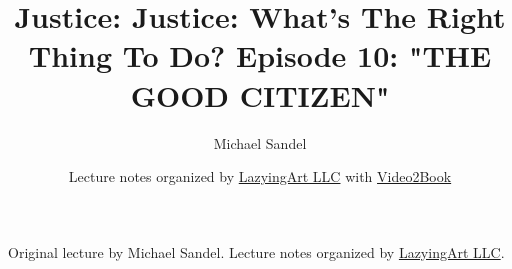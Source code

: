 \documentclass[11pt,oneside]{book}
\begin{document}
\frontmatter
\title{Justice: Justice: What's The Right Thing To Do? Episode 10: "THE GOOD CITIZEN"}
\author{Michael Sandel}
\date{Lecture notes organized by \href{https://lazying.art}{LazyingArt LLC} with \href{https://github.com/lachlanchen/Video2Book}{Video2Book}}
\maketitle
\begin{center}
\small Original lecture by Michael Sandel. Lecture notes organized by \href{https://lazying.art}{LazyingArt LLC}.
\end{center}
\clearpage
\mainmatter

\end{document}
